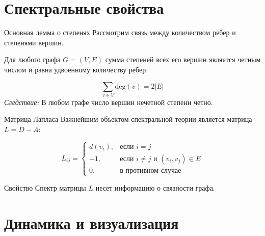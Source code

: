 \documentclass[10pt, aspectratio=169]{beamer}
\begin{document}
\section{Спектральные свойства}

\begin{frame}{Основная лемма о степенях}
    Рассмотрим связь между количеством ребер и степенями вершин.
    
    \begin{theorem}
        Для любого графа $G = (V, E)$ сумма степеней всех его вершин является четным числом и равна удвоенному количеству ребер.
    \end{theorem}
    
    \begin{equation}
        \sum_{v \in V} \text{deg}(v) = 2|E|
    \end{equation}
    \pause
    \textit{Следствие:} В любом графе число вершин нечетной степени четно.
\end{frame}

\begin{frame}{Матрица Лапласа}
    Важнейшим объектом спектральной теории является матрица $L = D - A$:
    
    \begin{equation}
        L_{ij} = 
        \begin{cases} 
        d(v_i), & \text{если } i = j \\
        -1, & \text{если } i \neq j \text{ и } (v_i, v_j) \in E \\
        0, & \text{в противном случае}
        \end{cases}
    \end{equation}
    
    \pause
    \begin{block}{Свойство}
        Спектр матрицы $L$ несет информацию о связности графа.
    \end{block}
\end{frame}

\section{Динамика и визуализация}
\end{document}
